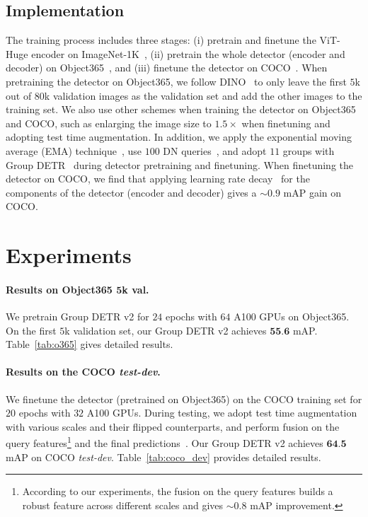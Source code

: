 \documentclass[10pt,twocolumn,letterpaper]{article}
\begin{document}
\subsection{Implementation} \label{details}
The training process includes three stages: 
(i) pretrain and finetune the ViT-Huge encoder on ImageNet-1K~\cite{deng2009imagenet}, 
(ii) pretrain the whole detector (encoder and decoder) on Object365~\cite{shao2019objects365}, 
and (iii) finetune the detector on COCO~\cite{lin2014microsoft}. When pretraining the detector on Object365, 
we follow DINO~\cite{zhang2022dino} to only leave the first $5$k out of $80$k validation images as the validation set 
and add the other images to the training set. 
We also use other schemes when training the detector on Object365 and COCO, 
such as enlarging the image size to $1.5\times$ when finetuning and adopting test time augmentation. 
In addition, we apply the exponential moving average (EMA) technique~\cite{tarvainen2017mean}, use $100$ DN queries~\cite{zhang2022dino}, and adopt $11$ groups with Group DETR~\cite{chen2022group} during detector pretraining and finetuning. When finetuning the detector on COCO, we find that applying learning rate decay~\cite{clark2020electra,bao2021beit,he2022masked,chen2022context} for the components of the detector (encoder and decoder) gives a $\sim$$0.9$ mAP gain on COCO.


\section{Experiments}

\paragraph{Results on Object365 $\textbf{5}$k val.} 
We pretrain Group DETR v2 for $24$ epochs with $64$ A100 GPUs on Object365. 
On the first $5$k validation set, our Group DETR v2 achieves $\textbf{55.6}$ mAP. Table~\ref{tab:o365} gives detailed results.

\paragraph{Results on the COCO {\em test-dev}.} 
We finetune the detector
(pretrained on Object365) 
on the COCO training set
for $20$ epochs with $32$ A100 GPUs. 
During testing, we adopt test time augmentation 
with various scales and their flipped counterparts,
and perform fusion on the query features\footnote{According to our experiments, the fusion on the query features builds a robust feature across different scales and gives $\sim$$0.8$ mAP improvement.} and the final predictions~\cite{zhang2022dino}. 
Our Group DETR v2 achieves $\textbf{64.5}$ mAP on COCO {\em test-dev}. 
Table~\ref{tab:coco_dev} provides detailed results. 
\end{document}
